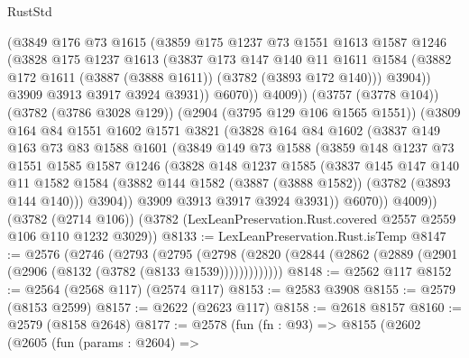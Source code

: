 \begin{lexlean}{RustStd}
\begin{coremodule}
              (@3849
                @176
                @73
                @1615
                (@3859
                  @175
                  @1237
                  @73
                  @1551
                  @1613
                  @1587
                  @1246
                  (@3828
                    @175
                    @1237
                    @1613
                    (@3837
                      @173
                      @147
                      @140
                      @11
                      @1611
                      @1584
                      (@3882 @172 @1611 (@3887 (@3888 @1611)) (@3782 (@3893 @172 @140)))
                      @3904))
                  @3909
                  @3913
                  @3917
                  @3924
                  @3931))
              @6070))
          @4009))
      (@3757 (@3778 @104))
      (@3782 (@3786 @3028 @129))
      (@2904 (@3795 @129 @106 @1565 @1551))
      (@3809
        @164
        @84
        @1551
        @1602
        @1571
        @3821
        (@3828
          @164
          @84
          @1602
          (@3837
            @149
            @163
            @73
            @83
            @1588
            @1601
            (@3849
              @149
              @73
              @1588
              (@3859
                @148
                @1237
                @73
                @1551
                @1585
                @1587
                @1246
                (@3828
                  @148
                  @1237
                  @1585
                  (@3837
                    @145
                    @147
                    @140
                    @11
                    @1582
                    @1584
                    (@3882 @144 @1582 (@3887 (@3888 @1582)) (@3782 (@3893 @144 @140)))
                    @3904))
                @3909
                @3913
                @3917
                @3924
                @3931))
            @6070))
        @4009))
    (@3782 (@2714 @106))
    (@3782 (LexLeanPreservation.Rust.covered @2557 @2559 @106 @110 @1232 @3029))
@8133 := LexLeanPreservation.Rust.isTemp
@8147 := @2576
    (@2746
      (@2793
        (@2795
          (@2798 (@2820 (@2844 (@2862 (@2889 (@2901 (@2906 (@8132 (@3782 (@8133 @1539)))))))))))))
@8148 := @2562 @117
@8152 := @2564 (@2568 @117) (@2574 @117)
@8153 := @2583 @3908
@8155 := @2579 (@8153 @2599)
@8157 := @2622 (@2623 @117)
@8158 := @2618 @8157
@8160 := @2579 (@8158 @2648)
@8177 := @2578
    (fun (fn : @93) =>
    @8155
      (@2602
        (@2605
          (fun (params : @2604) =>

\end{coremodule}
\end{lexlean}
